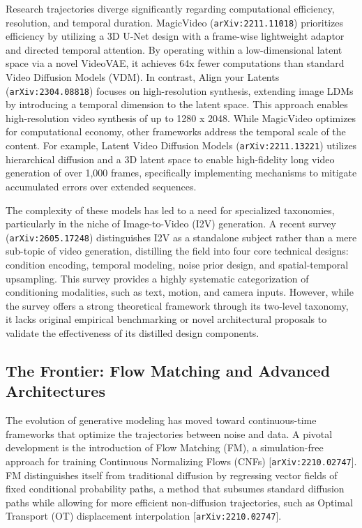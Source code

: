 \documentclass[11pt]{article}
\begin{document}
Research trajectories diverge significantly regarding computational efficiency, resolution, and temporal duration. MagicVideo (\texttt{arXiv:2211.11018}) prioritizes efficiency by utilizing a 3D U-Net design with a frame-wise lightweight adaptor and directed temporal attention. By operating within a low-dimensional latent space via a novel VideoVAE, it achieves 64x fewer computations than standard Video Diffusion Models (VDM). In contrast, Align your Latents (\texttt{arXiv:2304.08818}) focuses on high-resolution synthesis, extending image LDMs by introducing a temporal dimension to the latent space. This approach enables high-resolution video synthesis of up to 1280 x 2048. While MagicVideo optimizes for computational economy, other frameworks address the temporal scale of the content. For example, Latent Video Diffusion Models (\texttt{arXiv:2211.13221}) utilizes hierarchical diffusion and a 3D latent space to enable high-fidelity long video generation of over 1,000 frames, specifically implementing mechanisms to mitigate accumulated errors over extended sequences.

The complexity of these models has led to a need for specialized taxonomies, particularly in the niche of Image-to-Video (I2V) generation. A recent survey (\texttt{arXiv:2605.17248}) distinguishes I2V as a standalone subject rather than a mere sub-topic of video generation, distilling the field into four core technical designs: condition encoding, temporal modeling, noise prior design, and spatial-temporal upsampling. This survey provides a highly systematic categorization of conditioning modalities, such as text, motion, and camera inputs. However, while the survey offers a strong theoretical framework through its two-level taxonomy, it lacks original empirical benchmarking or novel architectural proposals to validate the effectiveness of its distilled design components.

\subsection{The Frontier: Flow Matching and Advanced Architectures}

The evolution of generative modeling has moved toward continuous-time frameworks that optimize the trajectories between noise and data. A pivotal development is the introduction of Flow Matching (FM), a simulation-free approach for training Continuous Normalizing Flows (CNFs) [\texttt{arXiv:2210.02747}]. FM distinguishes itself from traditional diffusion by regressing vector fields of fixed conditional probability paths, a method that subsumes standard diffusion paths while allowing for more efficient non-diffusion trajectories, such as Optimal Transport (OT) displacement interpolation [\texttt{arXiv:2210.02747}].
\end{document}
